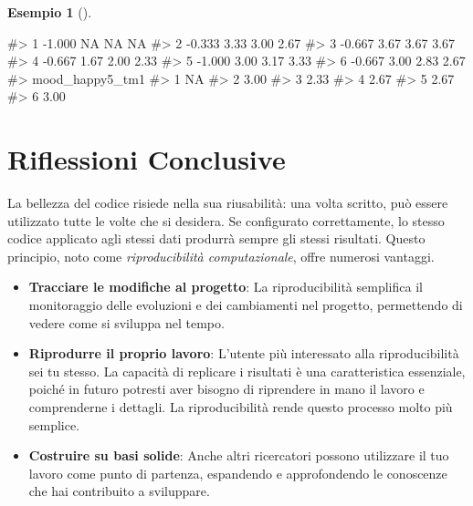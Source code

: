 \documentclass[
  letterpaper,
  DIV=11,
  numbers=noendperiod]{scrreprt}
\newenvironment{Shaded}{\begin{snugshade}}{\end{snugshade}}
\newcommand{\CommentTok}[1]{\textcolor[rgb]{0.37,0.37,0.37}{#1}}
\providecommand{\tightlist}{%
  \setlength{\itemsep}{0pt}\setlength{\parskip}{0pt}}\usepackage{longtable,booktabs,array}
\theoremstyle{definition}
\newtheorem{example}{Esempio}[chapter]
\theoremstyle{remark}
\begin{document}
\begin{example}[]
\begin{Shaded}
\begin{Highlighting}[]
\CommentTok{\#\textgreater{} 1             {-}1.000            NA            NA                NA}
\CommentTok{\#\textgreater{} 2             {-}0.333          3.33          3.00              2.67}
\CommentTok{\#\textgreater{} 3             {-}0.667          3.67          3.67              3.67}
\CommentTok{\#\textgreater{} 4             {-}0.667          1.67          2.00              2.33}
\CommentTok{\#\textgreater{} 5             {-}1.000          3.00          3.17              3.33}
\CommentTok{\#\textgreater{} 6             {-}0.667          3.00          2.83              2.67}
\CommentTok{\#\textgreater{}   mood\_happy5\_tm1}
\CommentTok{\#\textgreater{} 1              NA}
\CommentTok{\#\textgreater{} 2            3.00}
\CommentTok{\#\textgreater{} 3            2.33}
\CommentTok{\#\textgreater{} 4            2.67}
\CommentTok{\#\textgreater{} 5            2.67}
\CommentTok{\#\textgreater{} 6            3.00}
\end{Highlighting}
\end{Shaded}

\end{example}

\section{Riflessioni Conclusive}\label{riflessioni-conclusive-2}

La bellezza del codice risiede nella sua riusabilità: una volta scritto,
può essere utilizzato tutte le volte che si desidera. Se configurato
correttamente, lo stesso codice applicato agli stessi dati produrrà
sempre gli stessi risultati. Questo principio, noto come
\emph{riproducibilità computazionale}, offre numerosi vantaggi.

\begin{itemize}
\tightlist
\item
  \textbf{Tracciare le modifiche al progetto}: La riproducibilità
  semplifica il monitoraggio delle evoluzioni e dei cambiamenti nel
  progetto, permettendo di vedere come si sviluppa nel tempo.
\item
  \textbf{Riprodurre il proprio lavoro}: L'utente più interessato alla
  riproducibilità sei tu stesso. La capacità di replicare i risultati è
  una caratteristica essenziale, poiché in futuro potresti aver bisogno
  di riprendere in mano il lavoro e comprenderne i dettagli. La
  riproducibilità rende questo processo molto più semplice.
\item
  \textbf{Costruire su basi solide}: Anche altri ricercatori possono
  utilizzare il tuo lavoro come punto di partenza, espandendo e
  approfondendo le conoscenze che hai contribuito a sviluppare.
\end{itemize}
\end{document}
